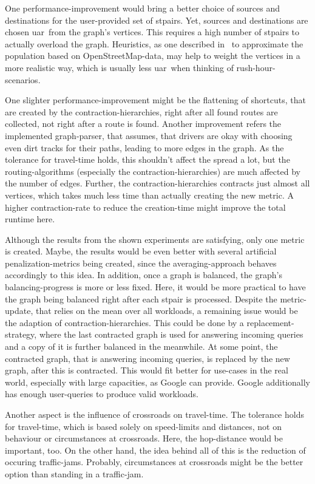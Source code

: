     One performance-improvement would bring a better choice of sources and destinations for the user-provided set of \glspl{stpair}.
    Yet, sources and destinations are chosen \gls{uar}\ from the graph's vertices.
    This requires a high number of \glspl{stpair} to actually overload the graph.
    Heuristics, as one described in~\cite{bakillah:population_from_osm} to approximate the population based on OpenStreetMap-data, may help to weight the vertices in a more realistic way, which is usually less \gls{uar}\ when thinking of rush-hour-scenarios.

    One slighter performance-improvement might be the flattening of shortcuts, that are created by the contraction-hierarchies, right after all found routes are collected, not right after a route is found.
    Another improvement refers the implemented graph-parser, that assumes, that drivers are okay with choosing even dirt tracks for their paths, leading to more edges in the graph.
    As the tolerance for travel-time holds, this shouldn't affect the spread a lot, but the routing-algorithms (especially the contraction-hierarchies) are much affected by the number of edges.
    Further, the contraction-hierarchies contracts just almost all vertices, which takes much less time than actually creating the new metric.
    A higher contraction-rate to reduce the creation-time might improve the total runtime here.

    Although the results from the shown experiments are satisfying, only one metric is created.
    Maybe, the results would be even better with several artificial penalization-metrics being created, since the averaging-approach behaves accordingly to this idea.
    In addition, once a graph is balanced, the graph's balancing-progress is more or less fixed.
    Here, it would be more practical to have the graph being balanced right after each \gls{stpair} is processed.
    Despite the metric-update, that relies on the mean over all workloads, a remaining issue would be the adaption of contraction-hierarchies.
    This could be done by a replacement-strategy, where the last contracted graph is used for answering incoming queries and a copy of it is further balanced in the meanwhile.
    At some point, the contracted graph, that is answering incoming queries, is replaced by the new graph, after this is contracted.
    This would fit better for use-cases in the real world, especially with large capacities, as Google can provide.
    Google additionally has enough user-queries to produce valid workloads.

    Another aspect is the influence of crossroads on travel-time.
    The tolerance holds for travel-time, which is based solely on speed-limits and distances, not on behaviour or circumstances at crossroads.
    Here, the hop-distance would be important, too.
    On the other hand, the idea behind all of this is the reduction of occuring traffic-jams.
    Probably, circumstances at crossroads might be the better option than standing in a traffic-jam.